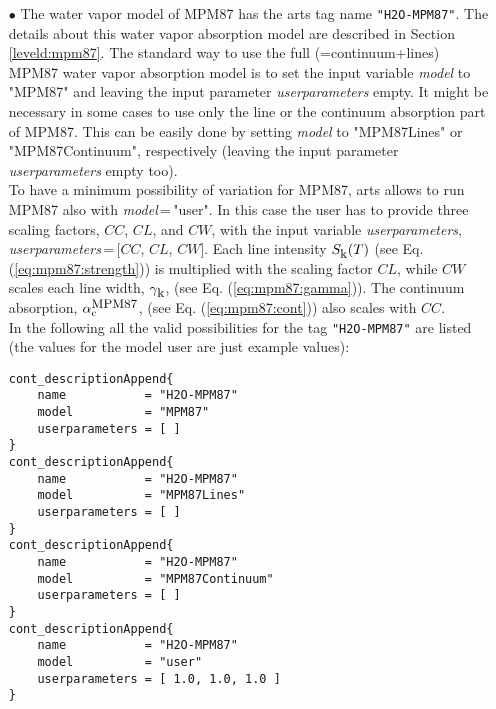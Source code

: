\begin{itemize}
\item[$\bullet$] The water vapor model of MPM87 \citep{liebeandlayton:87} 
     has the arts tag name {\tt "H2O-MPM87"}. The details about this water 
     vapor absorption model are described in Section \ref{leveld:mpm87}. 
     The standard way to use the full (=continuum+lines) MPM87 water 
     vapor absorption model is to set the input variable {\it model} 
     to "MPM87" and leaving the input parameter {\it userparameters} empty. 
     It might be necessary in some cases to use only the line or the 
     continuum absorption part of MPM87. This can be easily done 
     by setting {\it model} to "MPM87Lines" or "MPM87Continuum", 
     respectively (leaving the input parameter {\it userparameters} 
     empty too).\\ To have a minimum possibility of variation for MPM87, 
     arts allows to run MPM87 also with {\it model}\,=\,"user". 
     In this case the user has to provide three scaling factors,  
     $CC$, $CL$, and $CW$, with the input variable {\it userparameters}, 
     {\it userparameters}\,=\,$[$$CC$, $CL$, $CW$$]$. 
     Each line intensity $S_{\mbox{\rm \small k}}(T)$ (see Eq. (\ref{eq:mpm87:strength})) 
     is multiplied with the scaling factor $CL$, while $CW$ scales 
     each line width, $\gamma_{\mbox{\rm \small k}}$, (see Eq. (\ref{eq:mpm87:gamma})). 
     The continuum absorption, $\alpha^{\mbox{\rm \small MPM87}}_{\rm c}$, 
     (see Eq. (\ref{eq:mpm87:cont})) also scales with $CC$.\\
     In the following all the valid possibilities for the
     tag {\tt "H2O-MPM87"} are listed (the values for the 
     model user are just example values): 
\begin{verbatim}
cont_descriptionAppend{
    name           = "H2O-MPM87"
    model          = "MPM87"
    userparameters = [ ]
}
cont_descriptionAppend{
    name           = "H2O-MPM87"
    model          = "MPM87Lines"
    userparameters = [ ]
}
cont_descriptionAppend{
    name           = "H2O-MPM87"
    model          = "MPM87Continuum"
    userparameters = [ ]
}
cont_descriptionAppend{
    name           = "H2O-MPM87"
    model          = "user"
    userparameters = [ 1.0, 1.0, 1.0 ]
}
\end{verbatim}


\end{itemize}
